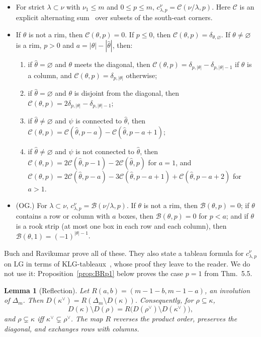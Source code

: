 \documentclass[11pt]{amsart}
\newtheorem{lemma}[theorem]{Lemma}
\theoremstyle{definition}
\theoremstyle{remark}
\newcommand{\LG}{\mathrm{LG}}
\newcommand{\OG}{\mathrm{OG}}
\newcommand{\cC}{\mathcal{C}}
\begin{document}
\begin{itemize}
\item \cite[Cor.~5.4]{BR12} For strict $\lambda\subset\nu$ with $\nu_1\le m$ and
$0\le p\le m$, $c^\nu_{\lambda,p}=\cC(\nu/\lambda,p)$. Here $\cC$ is an explicit alternating
sum~\cite[eq.~(11)]{BR12} over subsets of the south-east corners.
\item \cite[Thm.~5.5]{BR12} If $\theta$ is not a rim, then $\cC(\theta,p)=0$. If $p\le0$, then
$\cC(\theta,p)=\delta_{\theta,\varnothing}$. If $\theta\ne\varnothing$ is a rim, $p>0$ and
$a=|\theta|-|\hat\theta|$, then:
\begin{enumerate}[label=(\roman*)]
\item if $\hat\theta=\varnothing$ and $\theta$ meets the diagonal, then
$\cC(\theta,p)=\delta_{p,|\theta|}-\delta_{p,|\theta|-1}$ if $\theta$ is a column, and
$\cC(\theta,p)=\delta_{p,|\theta|}$ otherwise;
\item if $\hat\theta=\varnothing$ and $\theta$ is disjoint from the diagonal, then
$\cC(\theta,p)=2\delta_{p,|\theta|}-\delta_{p,|\theta|-1}$;
\item if $\hat\theta\ne\varnothing$ and $\psi$ is connected to $\hat\theta$, then
$\cC(\theta,p)=\cC(\hat\theta,p-a)-\cC(\hat\theta,p-a+1)$;
\item if $\hat\theta\ne\varnothing$ and $\psi$ is not connected to $\hat\theta$, then
$\cC(\theta,p)=2\cC(\hat\theta,p-1)-2\cC(\hat\theta,p)$ for $a=1$, and
$\cC(\theta,p)=2\cC(\hat\theta,p-a)-3\cC(\hat\theta,p-a+1)+\cC(\hat\theta,p-a+2)$ for $a>1$.
\end{enumerate}
\item \cite[Cor.~4.4, Lemma~4.5]{BR12} ($\OG$.) For $\lambda\subset\nu$,
$c^\nu_{\lambda,p}=\mathcal B(\nu/\lambda,p)$. If $\theta$ is not a rim, then
$\mathcal B(\theta,p)=0$; if $\theta$ contains a row or column with $a$ boxes, then
$\mathcal B(\theta,p)=0$ for $p<a$; and if $\theta$ is a rook strip (at most one box in each row
and each column), then $\mathcal B(\theta,1)=(-1)^{|\theta|-1}$.
\end{itemize}
Buch and Ravikumar prove all of these. They also state a tableau formula for $c^\nu_{\lambda,p}$
on $\LG$ in terms of KLG-tableaux~\cite[Cor.~5.6]{BR12}, whose proof they leave to the reader.
We do not use it: Proposition~\ref{prop:BRp1} below proves the case $p=1$ from Thm.~5.5.

\begin{lemma}[Reflection]\label{lem:S}
Let $R(a,b)=(m-1-b,m-1-a)$, an involution of $\Delta_m$. Then
$D(\kappa^\vee)=R(\Delta_m\setminus D(\kappa))$. Consequently, for $\rho\subseteq\kappa$,
\[ D(\kappa)\setminus D(\rho)=R\bigl(D(\rho^\vee)\setminus D(\kappa^\vee)\bigr), \]
and $\rho\subsetneq\kappa$ iff $\kappa^\vee\subsetneq\rho^\vee$. The map $R$ reverses the
product order, preserves the diagonal, and exchanges rows with columns.
\end{lemma}
\end{document}
